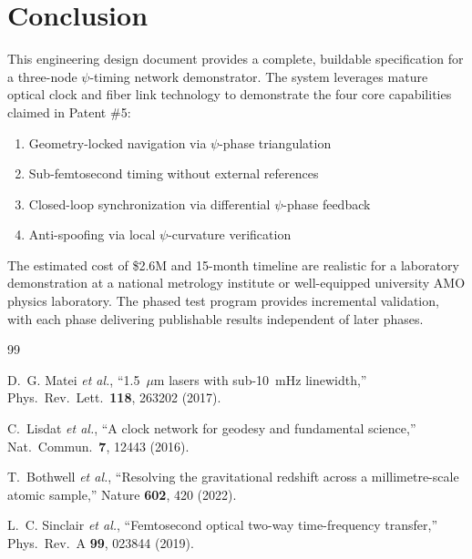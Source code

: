 \documentclass[12pt,letterpaper]{article}
\begin{document}
\section{Conclusion}

This engineering design document provides a complete, buildable
specification for a three-node $\psi$-timing network demonstrator. The
system leverages mature optical clock and fiber link technology to
demonstrate the four core capabilities claimed in Patent \#5:

\begin{enumerate}
\item Geometry-locked navigation via $\psi$-phase triangulation
\item Sub-femtosecond timing without external references
\item Closed-loop synchronization via differential $\psi$-phase feedback
\item Anti-spoofing via local $\psi$-curvature verification
\end{enumerate}

The estimated cost of \$2.6M and 15-month timeline are realistic for
a laboratory demonstration at a national metrology institute or
well-equipped university AMO physics laboratory. The phased test program
provides incremental validation, with each phase delivering publishable
results independent of later phases.


\begin{thebibliography}{99}

D.~G. Matei \textit{et al.},
``1.5~$\mu$m lasers with sub-10~mHz linewidth,''
Phys.\ Rev.\ Lett.\ \textbf{118}, 263202 (2017).

C.~Lisdat \textit{et al.},
``A clock network for geodesy and fundamental science,''
Nat.\ Commun.\ \textbf{7}, 12443 (2016).

T.~Bothwell \textit{et al.},
``Resolving the gravitational redshift across a millimetre-scale
atomic sample,''
Nature \textbf{602}, 420 (2022).

L.~C. Sinclair \textit{et al.},
``Femtosecond optical two-way time-frequency transfer,''
Phys.\ Rev.\ A \textbf{99}, 023844 (2019).

\end{thebibliography}
\end{document}
